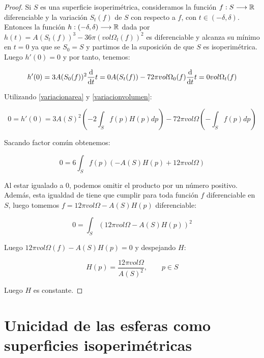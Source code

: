 \begin{proof}
Si $S$ es una superficie isoperimétrica, consideramos la función $f: S \longrightarrow \mathbb{R}$ diferenciable y la variación $S_t(f)$ de $S$ con respecto a $f$, con $t \in (-\delta, \delta)$. Entonces la función $h: (-\delta, \delta) \longrightarrow \mathbb{R}$ dada por $h(t) = A(S_t(f))^3 - 36\pi(vol \Omega_t(f))^2$ es diferenciable y alcanza su mínimo en $t=0$ ya que se $S_0=S$ y partimos de la suposición de que $S$ es isoperimétrica. Luego $h'(0)=0$ y por tanto, tenemos:

\begin{equation*}
    h'(0) = 3A(S_0(f))^2 \diff{}{t}{t=0} A(S_t(f)) - 72\pi vol \Omega_0(f) \diff{}{t}{t=0} vol \Omega_t(f)
\end{equation*}

Utilizando \autoref{variacionarea} y \autoref{variacionvolumen}:

\begin{equation*}
    0 = h'(0) = 3A(S)^2 \left( -2 \int_S f(p)H(p)dp \right) - 72\pi vol \Omega \left( - \int_S f(p) dp \right)
\end{equation*}

Sacando factor común obtenemos:

\begin{equation*}
    0 = 6 \int_S f(p)(-A(S)H(p) + 12 \pi vol \Omega)
\end{equation*}

Al estar igualado a 0, podemos omitir el producto por un número positivo. Además, esta igualdad de tiene que cumplir para toda función $f$ diferenciable en $S$, luego tomemos $f = 12 \pi vol \Omega - A(S)H(p)$ diferenciable:

\begin{equation*}
    0 = \int_S (12 \pi vol \Omega - A(S)H(p))^2
\end{equation*}

Luego $12 \pi vol \Omega(f) - A(S)H(p) = 0$ y despejando $H$:

\begin{equation*}
    H(p) = \frac{12 \pi vol \Omega}{A(S)^2}, \qquad p \in S
\end{equation*}


Luego $H$ es constante.
\end{proof}

\section{Unicidad de las esferas como superficies isoperimétricas}
